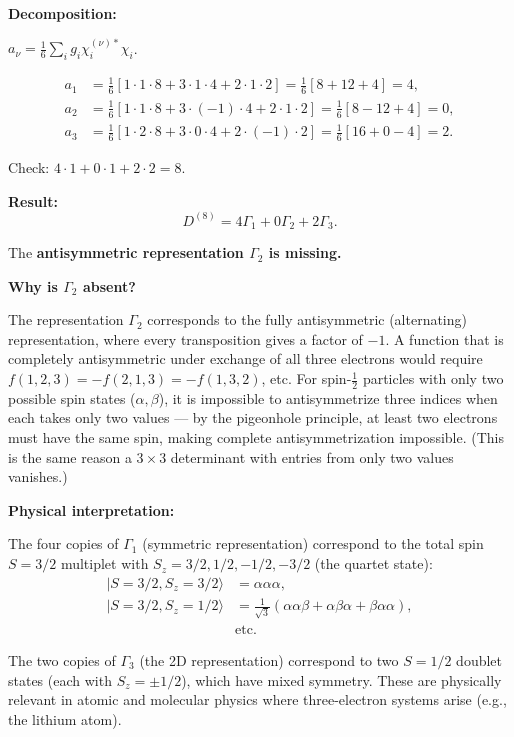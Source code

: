 \documentclass[12pt]{article}
\begin{document}
\medskip
\noindent\textbf{Decomposition:}

$a_\nu = \frac{1}{6}\sum_i g_i \chi_i^{(\nu)*}\chi_i$.

\begin{align*}
a_1 &= \frac{1}{6}[1\cdot 1\cdot 8 + 3\cdot 1\cdot 4 + 2\cdot 1\cdot 2] = \frac{1}{6}[8 + 12 + 4] = 4, \\
a_2 &= \frac{1}{6}[1\cdot 1\cdot 8 + 3\cdot(-1)\cdot 4 + 2\cdot 1\cdot 2] = \frac{1}{6}[8 - 12 + 4] = 0, \\
a_3 &= \frac{1}{6}[1\cdot 2\cdot 8 + 3\cdot 0\cdot 4 + 2\cdot(-1)\cdot 2] = \frac{1}{6}[16 + 0 - 4] = 2.
\end{align*}

Check: $4\cdot 1 + 0\cdot 1 + 2\cdot 2 = 8$. \checkmark

\medskip
\noindent\textbf{Result:}
\[
D^{(8)} = 4\Gamma_1 + 0\Gamma_2 + 2\Gamma_3.
\]

The \textbf{antisymmetric representation $\Gamma_2$ is missing.}

\medskip
\noindent\textbf{Why is $\Gamma_2$ absent?}

The representation $\Gamma_2$ corresponds to the fully antisymmetric (alternating) representation, where every transposition gives a factor of $-1$. A function that is completely antisymmetric under exchange of all three electrons would require $f(1,2,3) = -f(2,1,3) = -f(1,3,2)$, etc. For spin-$\frac{1}{2}$ particles with only two possible spin states ($\alpha, \beta$), it is impossible to antisymmetrize three indices when each takes only two values --- by the pigeonhole principle, at least two electrons must have the same spin, making complete antisymmetrization impossible. (This is the same reason a $3\times 3$ determinant with entries from only two values vanishes.)

\medskip
\noindent\textbf{Physical interpretation:}

The four copies of $\Gamma_1$ (symmetric representation) correspond to the total spin $S = 3/2$ multiplet with $S_z = 3/2, 1/2, -1/2, -3/2$ (the quartet state):
\begin{align*}
|S=3/2, S_z = 3/2\rangle &= \alpha\alpha\alpha, \\
|S=3/2, S_z = 1/2\rangle &= \tfrac{1}{\sqrt{3}}(\alpha\alpha\beta + \alpha\beta\alpha + \beta\alpha\alpha), \\
&\text{etc.}
\end{align*}

The two copies of $\Gamma_3$ (the 2D representation) correspond to two $S = 1/2$ doublet states (each with $S_z = \pm 1/2$), which have mixed symmetry. These are physically relevant in atomic and molecular physics where three-electron systems arise (e.g., the lithium atom).
\end{document}
